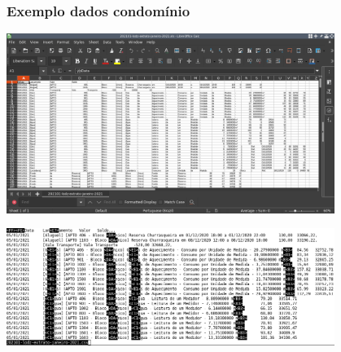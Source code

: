 \begin{frame}
\frametitle{Exemplo dados condomínio}
\centering
\includegraphics[width=0.8\textwidth,height=0.7\textheight,keepaspectratio]{examples/lodz-planilha-xls.png}

\framebreak
\includegraphics[width=0.8\textwidth,height=0.7\textheight,keepaspectratio]{examples/lodz-planilha-csv.png}

\framebreak


\framebreak


\framebreak


\framebreak



\end{frame}



